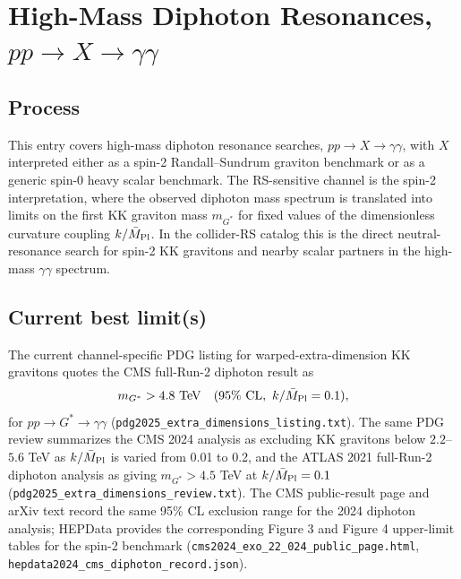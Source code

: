 
\section{\texorpdfstring{High-Mass Diphoton Resonances, \(pp\to X\to\gamma\gamma\)}{High-Mass Diphoton Resonances, pp to X to gamma gamma}}

\subsection*{Process}
This entry covers high-mass diphoton resonance searches,
\(pp\to X\to\gamma\gamma\), with \(X\) interpreted either as a spin-2
Randall--Sundrum graviton benchmark or as a generic spin-0 heavy scalar
benchmark.  The RS-sensitive channel is the spin-2 interpretation, where the
observed diphoton mass spectrum is translated into limits on the first KK
graviton mass \(m_{G^*}\) for fixed values of the dimensionless curvature
coupling \(k/\bar M_{\rm Pl}\).  In the collider-RS catalog this is the
direct neutral-resonance search for spin-2 KK gravitons and nearby scalar
partners in the high-mass \(\gamma\gamma\) spectrum.

\subsection*{Current best limit(s)}
The current channel-specific PDG listing for warped-extra-dimension KK
gravitons quotes the CMS full-Run-2 diphoton result as
\[
  m_{G^*} > 4.8~{\rm TeV}
  \quad (95\%~{\rm CL},~k/\bar M_{\rm Pl}=0.1),
\]
for \(pp\to G^*\to\gamma\gamma\)
(\texttt{pdg2025\_extra\_dimensions\_listing.txt}).  The same PDG review
summarizes the CMS 2024 analysis as excluding KK gravitons below
\(2.2\)--\(5.6\) TeV as \(k/\bar M_{\rm Pl}\) is varied from 0.01 to 0.2,
and the ATLAS 2021 full-Run-2 diphoton analysis as giving
\(m_{G^*}>4.5\) TeV at \(k/\bar M_{\rm Pl}=0.1\)
(\texttt{pdg2025\_extra\_dimensions\_review.txt}).  The CMS public-result
page and arXiv text record the same 95\% CL exclusion range for the 2024
diphoton analysis; HEPData provides the corresponding Figure 3 and Figure 4
upper-limit tables for the spin-2 benchmark
(\texttt{cms2024\_exo\_22\_024\_public\_page.html},
\texttt{hepdata2024\_cms\_diphoton\_record.json}).

